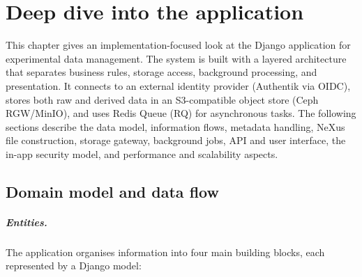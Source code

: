 \chapter{Deep dive into the application}\label{chap:deep-dive-app}

This chapter gives an implementation-focused look at the Django application for experimental data management. 
The system is built with a layered architecture that separates business rules, storage access, background processing, and presentation. 
It connects to an external identity provider (Authentik via OIDC), stores both raw and derived data in an S3-compatible object store (Ceph RGW/MinIO), 
and uses Redis Queue (RQ) for asynchronous tasks.
The following sections describe the data model, information flows, metadata handling, NeXus file construction, storage gateway, 
background jobs, API and user interface, the in-app security model, and performance and scalability aspects.


\section{Domain model and data flow}\label{sec:domain-dataflow}

\paragraph{Entities.}
The application organises information into four main building blocks, each represented by a Django model:

